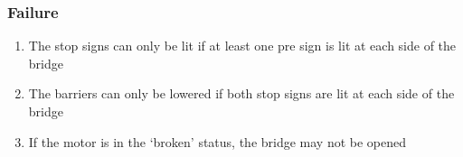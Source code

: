 \subsubsection*{Failure}
\begin{enumerate}
	\setcounter{enumi}{\theenumTemp}
	\item The stop signs can only be lit if at least one pre sign is lit at
	      each side of the bridge
	\item The barriers can only be lowered if both stop signs are lit at each
	      side of the bridge
	\item If the motor is in the `broken' status, the bridge may not be opened
	\setcounter{enumTemp}{\theenumi}
\end{enumerate}
